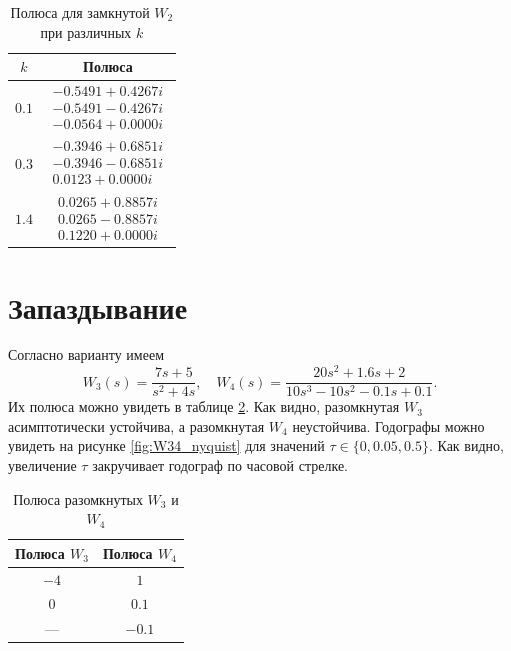 \begin{table}[H]
    \centering
    \caption{Полюса для замкнутой $W_2$ при различных $k$}
    \begin{tabular}{|c|c|}
        \hline
        $k$ & Полюса \\ \hline
        $0.1$ & $\begin{matrix}
            -0.5491 + 0.4267i\\ -0.5491 - 0.4267i\\-0.0564 + 0.0000i
        \end{matrix}$ \\ \hline
        $0.3$ & $\begin{matrix}
            -0.3946 + 0.6851i\\ -0.3946 - 0.6851i\\0.0123 + 0.0000i
        \end{matrix}$ \\ \hline
        $1.4$ & $\begin{matrix}
            0.0265 + 0.8857i\\ 0.0265 - 0.8857i\\0.1220 + 0.0000i
        \end{matrix}$ \\ \hline
    \end{tabular}
    \label{tab:W2clopolse}
\end{table}


\section{Запаздывание}

Согласно варианту имеем
\begin{equation*}
    W_3(s)=\frac{7s+5}{s^2+4s},\quad W_4(s)=\frac{20s^2+1.6s+2}{10s^3-10s^2-0.1s+0.1}.
\end{equation*}
Их полюса можно увидеть в таблице \ref{tab:polesW34}. Как видно, разомкнутая 
$W_3$ асимптотически устойчива, а разомкнутая $W_4$ неустойчива.
Годографы можно увидеть на рисунке \ref{fig:W34_nyquist} для значений
$\tau\in\{0, 0.05, 0.5\}$. Как видно, увеличение $\tau$ закручивает
годограф по часовой стрелке. 

\begin{table}[H]
    \centering
    \caption{Полюса разомкнутых $W_3$ и $W_4$}
    \begin{tabular}{|c|c|}
    \hline
    Полюса $W_3$ & Полюса $W_4$        \\ \hline
        $-4$ & $1$ \\ \hline
        $0$ & $0.1$ \\ \hline
        --- & $-0.1$ \\ \hline
    \end{tabular}
    \label{tab:polesW34}
\end{table}

